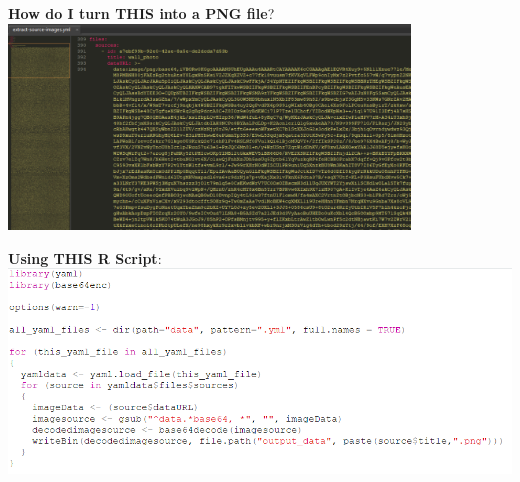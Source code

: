 \documentclass[unknownkeysallowed,usepdftitle=false, parskip=full, aspectratio=169]{beamer}
\newcommand{\secvariable}{nothing}
\newcommand{\mysection}[1]{\renewcommand{\secvariable}{#1}
}
\begin{document}
\mysection{major}

\begin{frame}\label{\secvariable}

\begin{center}
\vspace{-5mm}
\textbf{How do I turn THIS into a PNG file}?
\vfill
\includegraphics[width=0.8\textwidth,keepaspectratio]{figure/sublime_1.png}
\end{center}

\end{frame}


\begin{frame}\label{\secvariable}

\begin{center}
\textbf{Using THIS R Script}:
\includegraphics[width=1\textwidth,keepaspectratio]{figure/EXCRACT.PNG}
\end{center}

\end{frame}

\mysection{slab}
\end{document}
